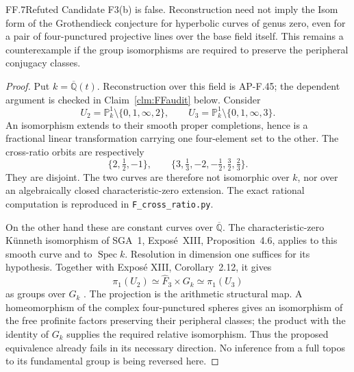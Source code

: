 \begin{claim}{FF.7}{Refuted}\label{clm:FF7}
Candidate F3(b) is false. Reconstruction need not imply the Isom
form of the Grothendieck conjecture for hyperbolic curves of genus
zero, even for a pair of four-punctured projective lines over the
base field itself. This remains a counterexample if the group
isomorphisms are required to preserve the peripheral conjugacy
classes.
\end{claim}
\begin{proof}
Put \(k=\overline{\mathbb Q}(t)\). Reconstruction over this field
is AP-F.45; the dependent argument is checked in
Claim~\ref{clm:FFaudit} below. Consider
\[
 U_2=\mathbb P^1_k\setminus\{0,1,\infty,2\},\qquad
 U_3=\mathbb P^1_k\setminus\{0,1,\infty,3\}.
\]
An isomorphism extends to their smooth proper completions, hence
is a fractional linear transformation carrying one four-element
set to the other. The cross-ratio orbits are respectively
\[
 \{2,\tfrac12,-1\},\qquad
 \{3,\tfrac13,-2,-\tfrac12,\tfrac32,\tfrac23\}.
\]
They are disjoint. The two curves are therefore not isomorphic
over \(k\), nor over an algebraically closed characteristic-zero
extension. The exact rational computation is reproduced in
\texttt{F\_cross\_ratio.py}.

On the other hand these are constant curves over
\(\overline{\mathbb Q}\). The characteristic-zero K\"unneth
isomorphism of SGA~1, Expos\'e~XIII, Proposition~4.6, applies to
this smooth curve and to \(\operatorname{Spec}k\). Resolution in
dimension one suffices for its hypothesis. Together with Expos\'e
XIII, Corollary~2.12, it gives
\[
 \pi_1(U_2)\simeq\widehat F_3\times G_k
          \simeq\pi_1(U_3)
\]
as groups over \(G_k\) \citep{FF_SGA1}. The projection is the
arithmetic structural map. A homeomorphism of the complex
four-punctured spheres gives an isomorphism of the free profinite
factors preserving their peripheral classes; the product with
the identity of \(G_k\) supplies the required relative isomorphism.
Thus the proposed equivalence already fails in its necessary
direction. No inference from a full topos to its fundamental
group is being reversed here.
\end{proof}

